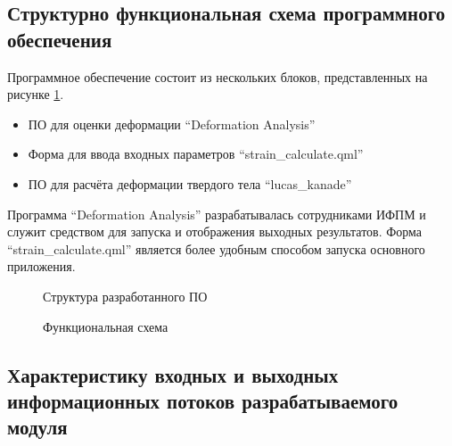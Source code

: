 \subsection{Структурно функциональная схема программного обеспечения}%

Программное обеспечение состоит из нескольких блоков, представленных на рисунке \ref{pic:shema_PO}.

\begin{itemize}
\item ПО для оценки деформации ``Deformation Analysis''
\item Форма для ввода входных параметров ``strain\_calculate.qml''
\item ПО для расчёта деформации твердого тела ``lucas\_kanade''
\end{itemize}

Программа ``Deformation Analysis'' разрабатывалась сотрудниками ИФПМ и служит средством для запуска и отображения выходных результатов. Форма ``strain\_calculate.qml'' является более удобным способом запуска основного приложения. 

\begin{figure}[ht]
\caption{Структура разработанного ПО}
\label{pic:shema_PO}
\end{figure}

\begin{figure}[ht]
\caption{Функциональная схема}
\label{pic:idef0}
\end{figure}

\subsection{Характеристику входных и выходных информационных потоков разрабатываемого модуля}



